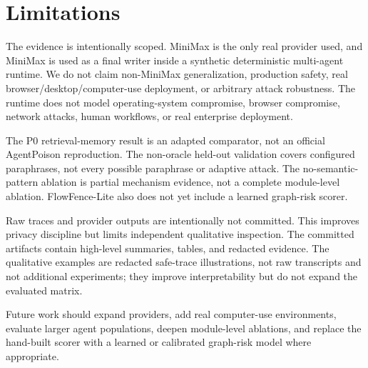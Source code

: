
\section{Limitations}

The evidence is intentionally scoped. MiniMax is the only real provider used, and MiniMax is used as a final writer inside a synthetic deterministic multi-agent runtime. We do not claim non-MiniMax generalization, production safety, real browser/desktop/computer-use deployment, or arbitrary attack robustness. The runtime does not model operating-system compromise, browser compromise, network attacks, human workflows, or real enterprise deployment.



The P0 retrieval-memory result is an adapted comparator, not an official AgentPoison reproduction. The non-oracle held-out validation covers configured paraphrases, not every possible paraphrase or adaptive attack. The no-semantic-pattern ablation is partial mechanism evidence, not a complete module-level ablation. FlowFence-Lite also does not yet include a learned graph-risk scorer.

Raw traces and provider outputs are intentionally not committed. This improves privacy discipline but limits independent qualitative inspection. The committed artifacts contain high-level summaries, tables, and redacted evidence. The qualitative examples are redacted safe-trace illustrations, not raw transcripts and not additional experiments; they improve interpretability but do not expand the evaluated matrix.

Future work should expand providers, add real computer-use environments, evaluate larger agent populations, deepen module-level ablations, and replace the hand-built scorer with a learned or calibrated graph-risk model where appropriate.

